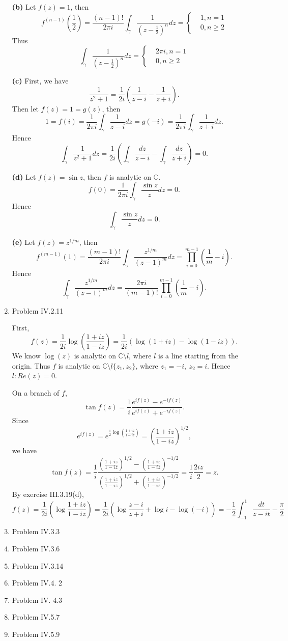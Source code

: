 \documentclass{article}%
\begin{document}
\begin{enumerate}
\textbf{(b)}
Let $f(z) = 1$, then 
$$
f^{(n-1)}(\frac{1}{2}) = \frac{(n-1)!}{2\pi i}\int_{\gamma}\frac{1}{(z-\frac{1}{2})^n} dz = \left\{
\begin{aligned}
& 1, n = 1 \\
& 0, n \ge 2
\end{aligned}
\right.
$$
Thus
$$
\int_{\gamma}\frac{1}{(z-\frac{1}{2})^n} dz = \left\{
\begin{aligned}
& 2\pi i, n = 1 \\
& 0, n \ge 2
\end{aligned}
\right.
$$

\textbf{(c)}
First, we have
$$
\frac{1}{z^2+1} = \frac{1}{2i}(\frac{1}{z-i}-\frac{1}{z+i}).
$$
Then let $f(z) = 1 = g(z)$, then
$$
1 = f(i) = \frac{1}{2\pi i}\int_{\gamma}\frac{1}{z-i}dz = g(-i) = \frac{1}{2\pi i}\int_{\gamma}\frac{1}{z+i}dz.
$$
Hence 
$$
\int_{\gamma}\frac{1}{z^2+1}dz = \frac{1}{2i}(\int_\gamma\frac{dz}{z-i}-\int_\gamma\frac{dz}{z+i}) = 0.
$$

\textbf{(d)}
Let $f(z) = \sin z$, then $f$ is analytic on $\mathbb{C}$.
$$
f(0) = \frac{1}{2\pi i}\int_{\gamma}\frac{\sin z}{z}dz = 0.
$$
Hence
$$
\int_\gamma \frac{\sin z}{z}dz = 0.
$$

\textbf{(e)}
Let $f(z) = z^{1/m} $, then
$$
f^{(m-1)}(1) = \frac{(m-1)!}{2\pi i}\int_{\gamma}\frac{z^{1/m}}{(z-1)^m}dz = \prod_{i=0}^{m-1}(\frac{1}{m}-i).
$$
Hence
$$
\int_{\gamma}\frac{z^{1/m}}{(z-1)^m}dz  = \frac{2\pi i}{(m-1)!}\prod_{i=0}^{m-1}(\frac{1}{m}-i).
$$


\item Problem IV.2.11

First, 
$$
f(z) = \frac{1}{2i}\log(\frac{1+iz}{1-iz}) = \frac{1}{2i}(\log(1+iz)-\log(1-iz)).
$$
We know $\log(z)$ is analytic on $\mathbb{C}\setminus l$, where $l$ is a line starting from the origin. Thus $f$ is analytic on $\mathbb{C}\setminus l\{z_1, z_2\}$, where $z_1 = -i, ~z_2 = i $. Hence $l: Re(z) = 0 $.

On a branch of $f$, 
$$
\tan f(z) = \frac{1}{i}\frac{e^{if(z)}-e^{-if(z)}}{e^{if(z)}+e^{-if(z)}}.
$$
Since
$$
e^{if(z)} = e^{\frac{1}{2}\log(\frac{1+iz}{1-iz})} = (\frac{1+iz}{1-iz})^{1/2},
$$
we have
$$
\tan f(z) = \frac{1}{i}\frac{(\frac{1+iz}{1-iz})^{1/2}-(\frac{1+iz}{1-iz})^{-1/2}}{(\frac{1+iz}{1-iz})^{1/2}+(\frac{1+iz}{1-iz})^{-1/2}} = \frac{1}{i}\frac{2iz}{2} = z.
$$
By exercise III.3.19(d),
$$
f(z) = \frac{1}{2i}(\log\frac{1+iz}{1-iz}) = \frac{1}{2i}(\log\frac{z-i}{z+i}+\log i-\log (-i)) = -\frac{1}{2}\int_{-1}^{1}\frac{dt}{z-it} - \frac{\pi}{2} 
$$


\item Problem IV.3.3

\item Problem IV.3.6

\item Problem IV.3.14

\item Problem IV.4. 2

\item Problem IV. 4.3

\item Problem IV.5.7

\item Problem IV.5.9


\end{enumerate}
\end{document}
